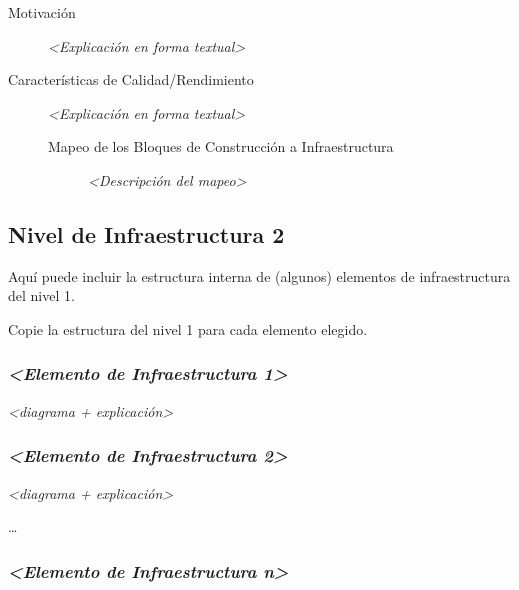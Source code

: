 \documentclass[]{article}
\begin{document}
\begin{description}
\item[Motivación]
\emph{\textless{}Explicación en forma textual\textgreater{}}
\item[Características de Calidad/Rendimiento]
\emph{\textless{}Explicación en forma textual\textgreater{}}

\begin{description}
\item[Mapeo de los Bloques de Construcción a Infraestructura]
\emph{\textless{}Descripción del mapeo\textgreater{}}
\end{description}
\end{description}

\hypertarget{_nivel_de_infraestructura_2}{%
\subsection{Nivel de Infraestructura
2}\label{_nivel_de_infraestructura_2}}

Aquí puede incluir la estructura interna de (algunos) elementos de
infraestructura del nivel 1.

Copie la estructura del nivel 1 para cada elemento elegido.

\hypertarget{__emphasis_elemento_de_infraestructura_1_emphasis}{%
\subsubsection{\texorpdfstring{\emph{\textless{}Elemento de
Infraestructura
1\textgreater{}}}{\textless{}Elemento de Infraestructura 1\textgreater{}}}\label{__emphasis_elemento_de_infraestructura_1_emphasis}}

\emph{\textless{}diagrama + explicación\textgreater{}}

\hypertarget{__emphasis_elemento_de_infraestructura_2_emphasis}{%
\subsubsection{\texorpdfstring{\emph{\textless{}Elemento de
Infraestructura
2\textgreater{}}}{\textless{}Elemento de Infraestructura 2\textgreater{}}}\label{__emphasis_elemento_de_infraestructura_2_emphasis}}

\emph{\textless{}diagrama + explicación\textgreater{}}

\ldots{}

\hypertarget{__emphasis_elemento_de_infraestructura_n_emphasis}{%
\subsubsection{\texorpdfstring{\emph{\textless{}Elemento de
Infraestructura
n\textgreater{}}}{\textless{}Elemento de Infraestructura n\textgreater{}}}\label{__emphasis_elemento_de_infraestructura_n_emphasis}}
\end{document}
